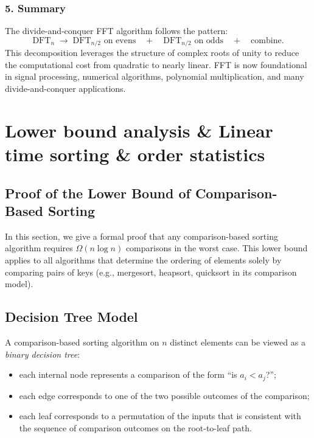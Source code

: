\documentclass[9pt]{extarticle}
\begin{document}
\subsubsection*{5. Summary}

The divide-and-conquer FFT algorithm follows the pattern:
\[
\text{DFT}_n \;\longrightarrow\; \text{DFT}_{n/2} \text{ on evens} 
\quad+\quad \text{DFT}_{n/2} \text{ on odds}
\quad+\quad \text{combine}.
\]
This decomposition leverages the structure of complex roots of unity to reduce
the computational cost from quadratic to nearly linear.  
FFT is now foundational in signal processing, numerical algorithms, 
polynomial multiplication, and many divide-and-conquer applications.

\newpage
\section{Lower bound analysis \& Linear time sorting \& order statistics}
\subsection{Proof of the Lower Bound of Comparison-Based Sorting}

In this section, we give a formal proof that any comparison-based sorting 
algorithm requires $\Omega(n \log n)$ comparisons in the worst case.
This lower bound applies to all algorithms that determine the ordering of 
elements solely by comparing pairs of keys (e.g., mergesort, heapsort, 
quicksort in its comparison model).



\subsection{Decision Tree Model}

A comparison-based sorting algorithm on $n$ distinct elements can be viewed as a 
\emph{binary decision tree}:
\begin{itemize}
    \item each internal node represents a comparison of the form “is $a_i < a_j$?”;
    \item each edge corresponds to one of the two possible outcomes of the comparison;
    \item each leaf corresponds to a permutation of the inputs that is consistent with 
          the sequence of comparison outcomes on the root-to-leaf path.
\end{itemize}
\end{document}
